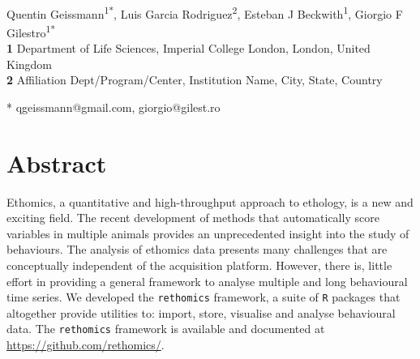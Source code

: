 \documentclass[10pt,letterpaper]{article}
\date{}
\begin{document}
\vspace*{0.2in}

\begin{flushleft}
{\Large
\textbf{} 
}
\newline
\\
Quentin Geissmann\textsuperscript{1*},
Luis Garcia Rodriguez\textsuperscript{2},
Esteban J Beckwith\textsuperscript{1},
Giorgio F Gilestro\textsuperscript{1*}
\\
\bigskip
\textbf{1} Department of Life Sciences, Imperial College London, London, United Kingdom
\\
\textbf{2} Affiliation Dept/Program/Center, Institution Name, City, State, Country %
\\
\bigskip


* qgeissmann@gmail.com, giorgio@gilest.ro

\end{flushleft}
\section*{Abstract}
Ethomics, a quantitative and high-throughput approach to ethology, is a new and exciting field.
The recent development of methods that automatically score variables in multiple animals provides an unprecedented insight into the study of behaviours. 
The analysis of ethomics data presents many challenges that are conceptually independent of the acquisition platform.
However, there is, little effort in providing a general framework to analyse multiple and long behavioural time series.
We developed the \texttt{rethomics} framework, a suite of \texttt{R} packages that altogether provide utilities to:
import, store, visualise and analyse behavioural data.
The \texttt{rethomics} framework is available and documented at \href{https://github.com/rethomics}{https://github.com/rethomics/}.



\end{document}
